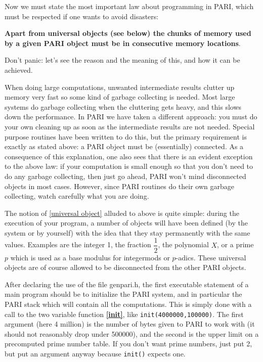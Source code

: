 Now we must state the most important law about programming in PARI, which
must be respected if one wants to avoid disasters:

{\bf Apart from universal objects {\rm (see below)} the chunks of memory
used by a given PARI object must be in consecutive memory locations}.

Don't panic: let's see the reason and the meaning of this, and how 
it can be achieved.

When doing large computations, unwanted intermediate results clutter up
memory very fast so some kind of garbage collecting is needed. Most large
systems do garbage collecting when the cluttering gets heavy, and this slows
down the performance. In PARI we have taken a different approach: you must
do your own cleaning up as soon as the intermediate results are not needed.
Special purpose routines have been written to do this, but the primary
requirement is exactly as stated above: a PARI object must be (essentially)
connected. As a consequence of this explanation, one also sees that there
is an evident exception to the above law: if your computation is small enough
so that you don't need to do any garbage collecting, then just go ahead,
PARI won't mind disconnected objects in most cases. However, since PARI
routines do their own garbage collecting, watch carefully what you are doing.

The notion of \ref{universal object} alluded to above is quite simple:
during the execution of your program, a number of objects will have been
defined (by the system or by yourself) with the idea that they stay permanently
with the same values. Examples are the integer 1, the fraction $\dfrac 1 2$,
the polynomial $X$, or a prime $p$ which is used as a base modulus for
integermods or $p$-adics. These universal objects are of course allowed to be
disconnected from the other PARI objects.

After declaring the use of the file genpari.h, the first executable statement
of a main program should be to initialize the PARI system, and in particular
the PARI stack which will contain all the computations. This is simply done
with a call to the two variable function {\bf \ref{init}}, like 
{\tt init(4000000,100000)}.
The first argument (here 4 million) is the number of bytes given to PARI to
work with (it should not reasonably drop under 500000), and the second is the
upper limit on a precomputed prime number table. If you don't want prime numbers,
just put 2, but put an argument anyway because {\tt init()} expects one.

